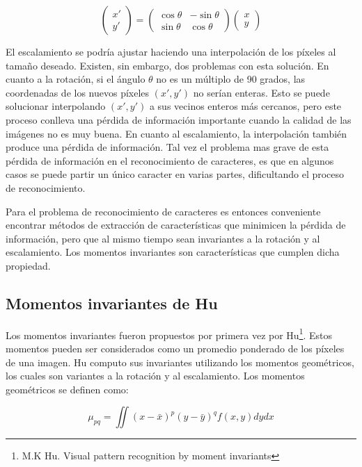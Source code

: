 \documentclass[a4paper, 11pt, oneside]{report}
\begin{document}
	\[
		\begin{pmatrix} 
			x' \\ y'
		\end{pmatrix}
		=
		\begin{pmatrix} 
			\cos\theta & -\sin\theta \\
			\sin\theta & \cos\theta
		\end{pmatrix}
		\begin{pmatrix} 
			x \\ y
		\end{pmatrix}
	\]

El escalamiento se podría ajustar haciendo una interpolación de los píxeles al tamaño deseado. Existen, sin embargo, dos problemas con esta solución. En cuanto a la rotación, si el ángulo $\theta$ no es un múltiplo de 90 grados, las coordenadas de los nuevos píxeles $(x', y')$ no serían enteras. Esto se puede solucionar interpolando $(x',y')$ a sus vecinos enteros más cercanos, pero este proceso conlleva una pérdida de información importante cuando la calidad de las imágenes no es muy buena. En cuanto al escalamiento, la interpolación también produce una pérdida de información. Tal vez el problema mas grave de esta pérdida de información en el reconocimiento de caracteres, es que en algunos casos se puede partir un único caracter en varias partes, dificultando el proceso de reconocimiento.

Para el problema de reconocimiento de caracteres es entonces conveniente encontrar métodos de extracción de características que minimicen la pérdida de información, pero que al mismo tiempo sean invariantes a la rotación y al escalamiento. Los momentos invariantes son características que cumplen dicha propiedad.

\subsection{Momentos invariantes de Hu}	
\label{sect:invariants}

Los momentos invariantes fueron propuestos por primera vez por Hu\footnote{M.K Hu. Visual pattern recognition by moment invariants}. Estos momentos pueden ser considerados como un promedio ponderado de los píxeles de una imagen. Hu computo sus invariantes utilizando los momentos geométricos, los cuales son variantes a la rotación y al escalamiento. Los momentos geométricos se definen como:

	\begin{equation}\label{eq1}
		\mu_{pq} = \iint{ {(x-\bar{x})^p} {(y-\bar{y})^q} f(x,y) dy dx }
	\end{equation}
\end{document}
